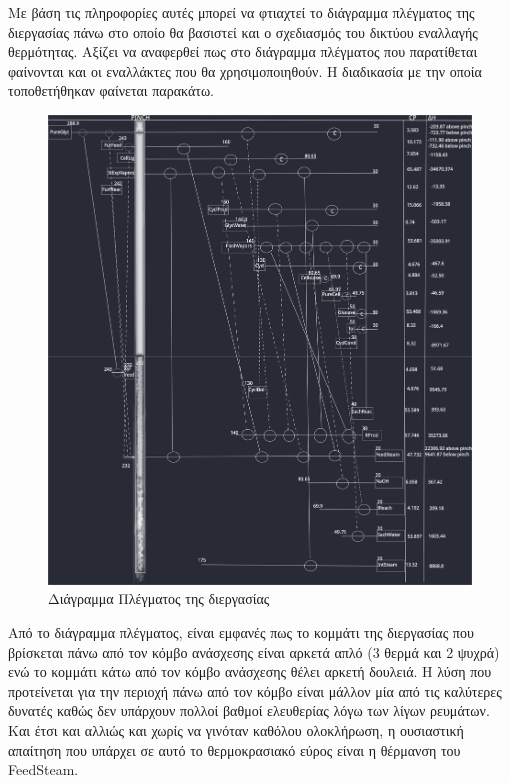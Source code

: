 \documentclass[11pt]{article}
\begin{document}
Με βάση τις πληροφορίες αυτές μπορεί να φτιαχτεί το διάγραμμα πλέγματος της διεργασίας πάνω στο οποίο θα βασιστεί και ο σχεδιασμός του δικτύου εναλλαγής θερμότητας. Αξίζει να αναφερθεί πως στο διάγραμμα πλέγματος που παρατίθεται φαίνονται και οι εναλλάκτες που θα χρησιμοποιηθούν. Η διαδικασία με την οποία τοποθετήθηκαν φαίνεται παρακάτω.

\begin{figure}[htbp]
\centering
\includegraphics[width=.9\linewidth]{Diagrams/grid_diagram.png}
\caption{Διάγραμμα Πλέγματος της διεργασίας}
\end{figure}

Από το διάγραμμα πλέγματος, είναι εμφανές πως το κομμάτι της διεργασίας που βρίσκεται πάνω από τον κόμβο ανάσχεσης είναι αρκετά απλό (3 θερμά και 2 ψυχρά) ενώ το κομμάτι κάτω από τον κόμβο ανάσχεσης θέλει αρκετή δουλειά. Η λύση που προτείνεται για την περιοχή πάνω από τον κόμβο είναι μάλλον μία από τις καλύτερες δυνατές καθώς δεν υπάρχουν πολλοί βαθμοί ελευθερίας λόγω των λίγων ρευμάτων. Και έτσι και αλλιώς και χωρίς να γινόταν καθόλου ολοκλήρωση, η ουσιαστική απαίτηση που υπάρχει σε αυτό το θερμοκρασιακό εύρος είναι η θέρμανση του FeedSteam.
\end{document}
